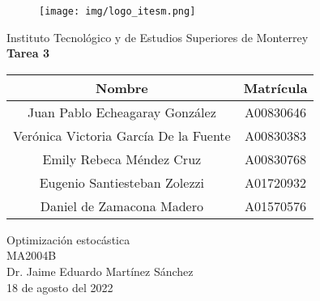 \documentclass{article}
\begin{document}
    \begin{titlepage}
        \begin{center}
            \begin{figure}
                \centering
                \texttt{[image: img/logo\_itesm.png]}\\ %
            \end{figure}
        \vspace{5cm}
        \LARGE{Instituto Tecnológico y de Estudios Superiores de Monterrey}\\
        \fontsize{12}{14}\selectfont
        \vspace{1cm}
        \textbf{Tarea 3}\\ %
        \vspace{0.7cm}
        \begin{table}[h!]
            \centering
            \begin{tabular}{ ||c|c|| }
                \hline
                Nombre & Matrícula \\
                \hline
                Juan Pablo Echeagaray González & A00830646 \\
                \hline
                Verónica Victoria García De la Fuente & A00830383 \\
                \hline
                Emily Rebeca Méndez Cruz & A00830768 \\
                \hline
                Eugenio Santiesteban Zolezzi & A01720932 \\
                \hline
                Daniel de Zamacona Madero & A01570576 \\
                \hline
            \end{tabular}
        \end{table}
        \vspace{0.7cm}
        Optimización estocástica\\ %
        \vspace{0.2cm}
        MA2004B\\ %
        \vspace{0.2cm}
        Dr. Jaime Eduardo Martínez Sánchez\\ %
        \vspace{0.7cm}
        18 de agosto del 2022\\ %
        \end{center}
    \end{titlepage}
\end{document}

